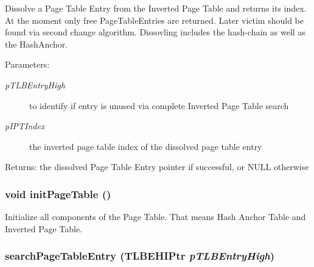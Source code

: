 Dissolve a Page Table Entry from the Inverted Page Table and returns its index. At the moment only free PageTableEntries are returned. Later victim should be found via second change algorithm. Dissovling includes the hash-chain as well as the HashAnchor. \begin{Desc}
\item[Parameters:]
\begin{description}
\item[{\em pTLBEntryHigh}]to identify if entry is unused via complete Inverted Page Table search \item[{\em pIPTIndex}]the inverted page table index of the dissolved page table entry \end{description}
\end{Desc}
\begin{Desc}
\item[Returns:]the dissolved Page Table Entry pointer if successful, or NULL otherwise \end{Desc}
\hypertarget{group___v_m_m___p_t_gf5ebfb7e466013140327368b655792fe}{
\subsubsection[{initPageTable}]{\setlength{\rightskip}{0pt plus 5cm}void initPageTable ()}}
\label{group___v_m_m___p_t_gf5ebfb7e466013140327368b655792fe}


Initialize all components of the Page Table. That means Hash Anchor Table and Inverted Page Table. \hypertarget{group___v_m_m___p_t_g8edbef60b1d72e6ad3dffed3c57b5e7c}{
\subsubsection[{searchPageTableEntry}]{ searchPageTableEntry ({\bf TLBEHIPtr} {\em pTLBEntryHigh})}}
\label{group___v_m_m___p_t_g8edbef60b1d72e6ad3dffed3c57b5e7c}


